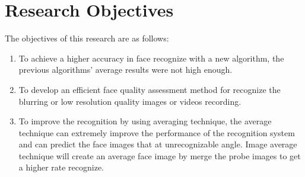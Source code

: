 \documentclass[12pt]{article}
\begin{document}
\section{Research Objectives}
The objectives of this research are as follows:
\begin{enumerate}
  \item To achieve a higher accuracy in face recognize with a new algorithm, the previous algorithms’ average results were not high enough.
  \item To develop an efficient face quality assessment method for recognize the blurring or low resolution quality images or videos recording.
  \item To improve the recognition by using averaging technique, the average technique can extremely improve the performance of the recognition system and can predict the face images that at unrecognizable angle. Image average technique will create an average face image by merge the probe images to get a higher rate recognize.
\end{enumerate}
	
\end{document}

